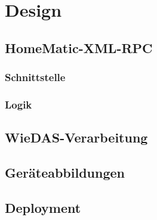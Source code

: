 \chapter{Design}
\label{design}

\section{HomeMatic-XML-RPC}

\subsection{Schnittstelle}

\subsection{Logik}

\section{WieDAS-Verarbeitung}

\section{Geräteabbildungen}

\section{Deployment}
